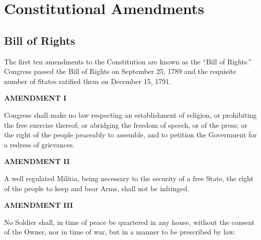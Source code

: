 %
%
%
%
%
%

\chapter{Constitutional Amendments}

\section{Bill of Rights}

The first ten amendments to the Constitution are known as the ``Bill of Rights.''  Congress passed the Bill of Rights on September 25, 1789 and the requisite number of States ratified them on December 15, 1791.

\begin{center} \textbf{AMENDMENT I} \end{center}

Congress shall make no law respecting an establishment of religion, or prohibiting the free exercise thereof; or abridging the freedom of speech, or of the press; or the right of the people peaceably to assemble, and to petition the Government for a redress of grievances.

\begin{center} \textbf{AMENDMENT II} \end{center} 

A well regulated Militia, being necessary to the security of a free State, the right of the people to keep and bear Arms, shall not be infringed.

\begin{center} \textbf{AMENDMENT III} \end{center} 

No Soldier shall, in time of peace be quartered in any house, without the consent of the Owner, nor in time of war, but in a manner to be prescribed by law.

